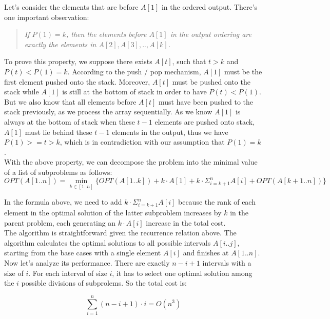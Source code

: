Let's consider the elements that are before $A[1]$ in the ordered output. There's one important observation:

\begin{quote}
  \textit{If $P(1) = k$, then the elements before $A[1]$ in the output ordering are exactly the elements in $A[2], A[3], .., A[k]$.}
\end{quote}

To prove this property, we suppose there exists $A[t]$, such that $t > k$ and $P(t) < P(1) = k$. According to the push / pop mechanism, $A[1]$ must be the first element pushed onto the stack. Moreover, $A[t]$ must be pushed onto the stack while $A[1]$ is still at the bottom of stack in order to have $P(t) < P(1)$. But we also know that all elements before $A[t]$ must have been pushed to the stack previously, as we process the array sequentially. As we know $A[1]$ is always at the bottom of stack when these $t - 1$ elements are pushed onto stack, $A[1]$ must lie behind these $t - 1$ elements in the output, thus we have $P(1) >= t > k$, which is in contradiction with our assumption that $P(1) = k$.\\

With the above property, we can decompose the problem into the minimal value of a list of subproblems as follows:
\[
OPT(A[1..n]) = \min_{k \in [1..n]} \{ OPT(A[1..k]) + k \cdot A[1] + k \cdot \Sigma_{i = k + 1}^{n}A[i] + OPT(A[k+1..n]) \}
\]

In the formula above, we need to add $k \cdot \Sigma_{i = k + 1}^{n}A[i]$ because the rank of each element in the optimal solution of the latter subproblem increases by $k$ in the parent problem, each generating an $k\cdot A[i]$ increase in the total cost.\\

The algorithm is straightforward given the recurrence relation above. The algorithm calculates the optimal solutions to all possible intervals $A[i..j]$, starting from the base cases with a single element $A[i]$ and finishes at $A[1..n]$.\\
Now let's analyze its performance. There are exactly $n - i + 1$ intervals with a size of $i$. For each interval of size $i$, it has to select one optimal solution among the $i$ possible divisions of subprolems. So the total cost is:

\[
   \sum_{i=1}^{n} (n - i + 1) \cdot i = O(n^3)
\]
